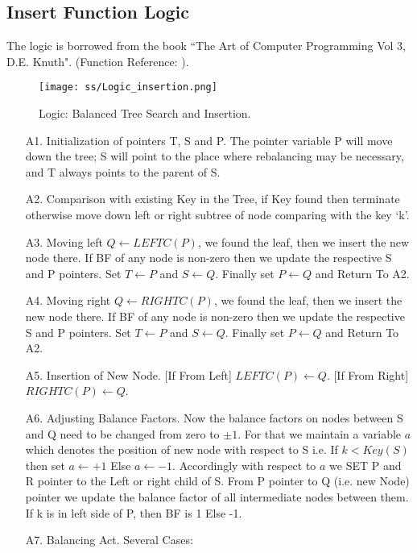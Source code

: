 \documentclass{article}
\begin{document}
\subsection{Insert Function Logic}
The logic is borrowed from the book ``The Art of Computer Programming Vol 3, D.E. Knuth". (Function Reference: ).
        \begin{figure}[H]
                \centering
                \texttt{[image: ss/Logic\_insertion.png]}
            \caption{Logic: Balanced Tree Search and Insertion.}
        \label{fig:logic_insert}
        \end{figure}  
\begin{itemize}
	\item[A1.] Initialization of pointers T, S and P. The pointer variable P will move down the tree; S will point to the place where rebalancing may be necessary, and T always points to the parent of S.
	\item[A2.] Comparison with existing Key in the Tree, if Key found then terminate otherwise move down left or right subtree of node comparing with the key `k'.
	\item[A3.] Moving left $Q \leftarrow LEFTC(P)$, we found the leaf, then we insert the new node there. If BF of any node is non-zero then we update the respective S and P pointers. Set $T \leftarrow P$ and $S \leftarrow Q$. Finally set $P \leftarrow Q$ and Return To A2.
	\item[A4.] Moving right $Q \leftarrow RIGHTC(P)$, we found the leaf, then we insert the new node there. If BF of any node is non-zero then we update the respective S and P pointers. Set $T \leftarrow P$ and $S \leftarrow Q$. Finally set $P \leftarrow Q$ and Return To A2.
	\item[A5.] Insertion of New Node. [If From Left] $LEFTC(P) \leftarrow Q$. [If From Right] $RIGHTC(P) \leftarrow Q$.
	\item[A6.] Adjusting Balance Factors. Now the balance factors on nodes between S and Q need to be changed from zero to $\pm1$. For that we maintain a variable $a$ which denotes the position of new node with respect to S i.e. If $k < Key(S) $ then set $a \leftarrow +1$ Else $a \leftarrow -1$. 
	\newline
	Accordingly with respect to $a$ we SET P and R pointer to the Left or right child of S. From P pointer to Q (i.e. new Node) pointer we update the balance factor of all intermediate nodes between them. If k is in left side of P, then BF is 1 Else -1.
	\item[A7.] Balancing Act. Several Cases:

\end{itemize}
\end{document}
